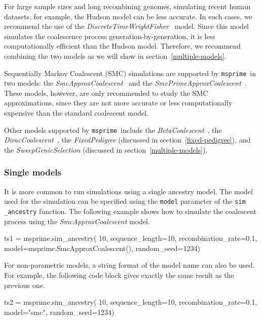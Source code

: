 \documentclass[graybox]{svmult}
\newcommand{\msprime}[0]{\texttt{msprime}}
\begin{document}
For large sample sizes and long recombining genomes, simulating recent human datasets, for example, the Hudson model can be
less accurate. In such cases, we recommend the use of the \emph{DiscreteTimeWrightFisher}~\citep{nelson2020accounting} model.
Since this model simulates the coalescence process generation-by-generation, it is less computationally efficient than the
Hudson model. Therefore, we recommend combining the two models as we will show in section~\ref{multiple-models}.

Sequentially Markov Coalescent (SMC) simulations are supported by \msprime\ in two models: the \emph{SmcApproxCoalescent}~\citep{mcvean2005approximating}
and the \emph{SmcPrimeApproxCoalescent}~\citep{marjoram2006fast}. These models, however, are only
recommended to study the SMC approximations, since they are not more accurate or less computationally expensive than the standard coalescent model.

Other models supported by \msprime\ include the \emph{BetaCoalescent}~\citep{schweinsberg03}, the \emph{DiracCoalescent}~\citep{BBE13},
the \emph{FixedPedigree} (discussed in section~\ref{fixed-pedigree}), and the \emph{SweepGenicSelection} (discussed in section~\ref{multiple-models}).


\subsubsection{Single models}\label{single-models}

It is more common to run simulations using a single ancestry model. The model used for the simulation can be specified using the \texttt{model} parameter
of the \texttt{sim} \texttt{\_ancestry} function. The following example shows how to simulate the coalescent process using the \emph{SmcApproxCoalescent} model.

\begin{pythoncode}
ts1 = msprime.sim_ancestry(
    10, sequence_length=10, recombination_rate=0.1,
    model=msprime.SmcApproxCoalescent(), random_seed=1234)
\end{pythoncode}

For non-parametric models, a string format of the model name can also be used. For example, the following code block gives exactly the
same result as the previous one.

\begin{pythoncode}
ts2 = msprime.sim_ancestry(
    10, sequence_length=10, recombination_rate=0.1,
    model="smc", random_seed=1234)
\end{pythoncode}
\end{document}
